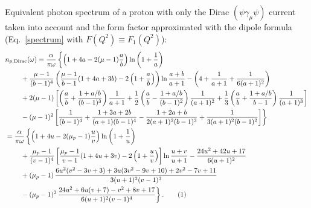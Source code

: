 \documentclass[a4paper,12pt]{article}
\begin{document}
Equivalent photon spectrum of a proton with only the Dirac $(\psi \gamma_\mu
\psi)$ current taken into account and the form factor approximated with the
dipole formula (Eq.~\eqref{spectrum} with $F(Q^2) \equiv F_1(Q^2)$):
\begin{align*}
   &n_{p, \text{Dirac}}(\omega)
    = \frac{\alpha}{\pi \omega}
      \left\{
          \left( 1 + 4 a - 2 (\mu - 1) \frac{a}{b} \right)
          \ln\left( 1 + \frac{1}{a} \right)
   \right. \\ &\qquad \left. {}
        + \frac{\mu - 1}{(b - 1)^4}
          \left(
            \frac{\mu - 1}{b - 1} (1 + 4 a + 3 b) - 2 \left( 1 + \frac{a}{b} \right)
          \right)
          \ln \frac{a + b}{a + 1}
        - \left( 4 + \frac{1}{a + 1} + \frac{1}{6 (a + 1)^2} \right)
   \right. \\ &\qquad \left. {}
        + 2 (\mu - 1) \left[
              \left( \frac{a}{b} + \frac{1 + a/b}{(b - 1)^3} \right)
              \frac{1}{a + 1}
            + \frac12
              \left( \frac{a}{b} - \frac{1 + a/b}{(b - 1)^2} \right)
              \frac{1}{(a + 1)^2}
            + \frac13
              \left( \frac{a}{b} + \frac{1 + a/b}{b - 1} \right)
              \frac{1}{(a + 1)^3}
         \right]
   \right. \\ &\qquad \left. {}
       - (\mu - 1)^2
         \left[
           \frac{1}{(b - 1)^4}
           + \frac{1 + 3 a + 2 b}{(a + 1) (b - 1)^4}
           - \frac{1 + 2 a + b}{2 (a + 1)^2 (b - 1)^3}
           + \frac{1}{3 (a + 1)^2 (b - 1)^2}
         \right]
     \right\}
    \\
    &= \frac{\alpha}{\pi \omega}
       \left\{
           \left( 1 + 4 u - 2 (\mu_p - 1) \frac{u}{v} \right)
           \ln \left( 1 + \frac{1}{u} \right)
    \right. \\ &\qquad \left. {}
         + \frac{\mu_p - 1}{(v - 1)^4} \left[
               \frac{\mu_p - 1}{v - 1} (1 + 4 u + 3 v)
             - 2 \left( 1 + \frac{u}{v} \right)
           \right]
           \ln \frac{u + v}{u + 1}
         - \frac{24 u^2 + 42 u + 17}{6 (u + 1)^2}
    \right. \\ &\qquad \left. {}
         + (\mu_p - 1) \,
           \frac{
             6 u^2 (v^2 - 3 v + 3) + 3 u (3 v^2 - 9 v + 10) + 2 v^2 - 7 v + 11
           }{
             3 (u + 1)^2 (v - 1)^3
           }
    \right. \\ &\qquad \left. {}
         - (\mu_p - 1)^2 \,
           \frac{
             24 u^2 + 6 u (v + 7) - v^2 + 8 v + 17
           }{
             6 (u + 1)^2 (v - 1)^4
           }
       \right\}.
    \stepcounter{equation}
    \tag{\theequation}
    \\
\end{align*}
\end{document}

